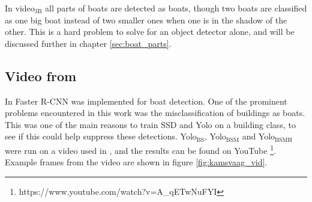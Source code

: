 \newpage

In video$_{\text{3B}}$ all parts of boats are detected as boats, though two boats are classified as one big boat instead of two smaller ones when one is in the shadow of the other. This is a hard problem to solve for an object detector alone, and will be discussed further in chapter \ref{sec:boat_parts}. 


\subsection{Video from \citep{Kamsvag2018}}
\label{sec:vid_kams}

In \citep{Kamsvag2018} Faster R-CNN was implemented for boat detection. One of the prominent problems encountered in this work was the misclassification of buildings as boats. This was one of the main reasons to train SSD and Yolo on a building class, to see if this could help suppress these detections. Yolo$_{\text{BS}}$, Yolo$_{\text{BSM}}$ and Yolo$_{\text{BSMH}}$ were run on a video used in \citep{Kamsvag2018}, and the results can be found on YouTube \footnote{https://www.youtube.com/watch?v=A\_qETwNuFYI}. Example frames from the video are shown in figure \ref{fig:kamsvaag_vid}.

